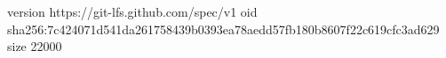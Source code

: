 version https://git-lfs.github.com/spec/v1
oid sha256:7c424071d541da261758439b0393ea78aedd57fb180b8607f22c619cfc3ad629
size 22000
